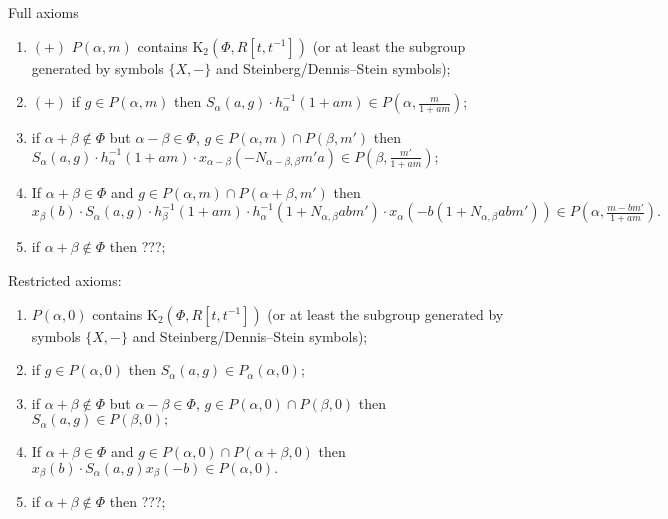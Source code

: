\documentclass[oneside, 8pt]{amsart}
\theoremstyle{remark}
\theoremstyle{definition}
\numberwithin{equation}{section}
\begin{document}
Full axioms
\begin{enumerate}
 \item $(+)$ $P(\alpha, m)$ contains $\mathrm{K}_2(\Phi, R[t, t^{-1}])$ (or at least the subgroup generated by symbols $\{ X, - \}$ and Steinberg/Dennis--Stein symbols);
 \item $(+)$ if $g \in P(\alpha, m)$ then $S_\alpha(a, g) \cdot h_\alpha^{-1}(1 + am) \in P(\alpha, \frac{m}{1 + am})$;
 \item if $\alpha + \beta \not \in \Phi$ but $\alpha - \beta \in \Phi$, $g \in P(\alpha, m) \cap P(\beta, m')$ then
$S_\alpha(a, g)\cdot  h^{-1}_\alpha(1 + am) \cdot x_{\alpha-\beta}(-N_{\alpha-\beta, \beta}m'a) \in P(\beta, \frac{m'}{1 + am});$
 \item If $\alpha + \beta \in \Phi$ and $g \in P(\alpha, m) \cap P(\alpha + \beta, m')$ then
 $x_\beta(b) \cdot S_\alpha(a, g) \cdot h_{\beta}^{-1}(1+am)\cdot h_{\alpha}^{-1}(1 + N_{\alpha, \beta}abm')\cdot x_{\alpha}(-b(1 + N_{\alpha, \beta}abm')) \in P(\alpha, \frac{m - bm'}{1+am}).$
 \item if $\alpha + \beta \not \in \Phi$ then ???;
\end{enumerate}

Restricted axioms:
\begin{enumerate}
 \item $P(\alpha, 0)$ contains $\mathrm{K}_2(\Phi, R[t, t^{-1}])$ (or at least the subgroup generated by symbols $\{ X, - \}$ and Steinberg/Dennis--Stein symbols);
 \item if $g \in P(\alpha, 0)$ then $S_\alpha(a, g) \in P_\alpha(\alpha, 0)$;
 \item if $\alpha + \beta \not \in \Phi$ but $\alpha - \beta \in \Phi$, $g \in P(\alpha, 0) \cap P(\beta, 0)$ then
$S_\alpha(a, g) \in P(\beta, 0);$
 \item If $\alpha + \beta \in \Phi$ and $g \in P(\alpha, 0) \cap P(\alpha + \beta, 0)$ then
 $x_\beta(b) \cdot S_\alpha(a, g) x_{\beta}(-b)\in P(\alpha, 0).$
 \item if $\alpha + \beta \not \in \Phi$ then ???;
\end{enumerate}
\end{document}
